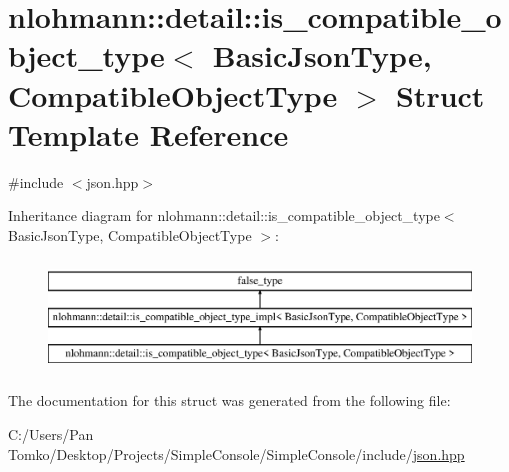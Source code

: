 \hypertarget{structnlohmann_1_1detail_1_1is__compatible__object__type}{}\section{nlohmann\+::detail\+::is\+\_\+compatible\+\_\+object\+\_\+type$<$ Basic\+Json\+Type, Compatible\+Object\+Type $>$ Struct Template Reference}
\label{structnlohmann_1_1detail_1_1is__compatible__object__type}


{\ttfamily \#include $<$json.\+hpp$>$}

Inheritance diagram for nlohmann\+::detail\+::is\+\_\+compatible\+\_\+object\+\_\+type$<$ Basic\+Json\+Type, Compatible\+Object\+Type $>$\+:\begin{figure}[H]
\begin{center}
\leavevmode
\includegraphics[height=3.000000cm]{d5/dda/structnlohmann_1_1detail_1_1is__compatible__object__type}
\end{center}
\end{figure}


The documentation for this struct was generated from the following file\+:\begin{DoxyCompactItemize}
\item 
C\+:/\+Users/\+Pan Tomko/\+Desktop/\+Projects/\+Simple\+Console/\+Simple\+Console/include/\mbox{\hyperlink{json_8hpp}{json.\+hpp}}\end{DoxyCompactItemize}
